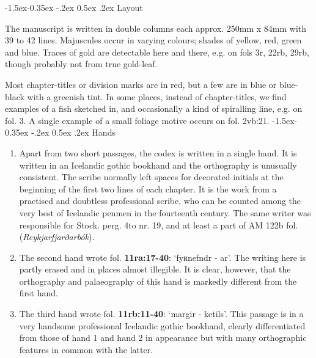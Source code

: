 \documentclass[11pt,twoside]{article}\makeatletter
\makeatletter
\def\ref{}
\renewcommand\subsubsection{\@startsection{subsubsection}{3}{\z@}%
     {-1.5ex\@plus -0.35ex \@minus -.2ex}%
     {0.5ex \@plus .2ex}%
     {\reset@font\large\sffamily}}
\makeatother
\begin{document}
\subsubsection{Layout}
\par
The manuscript is written in double columns each approx. 250mm x 84mm with 39 to 42 lines. Majuscules occur in varying colours; shades of yellow, red, green and blue. Traces of gold are detectable here and there, e.g. on fols 3r, 22rb, 29rb, though probably not from true gold-leaf. \par
Most chapter-titles or division marks are in red, but a few are in blue or blue-black with a greenish tint. In some places, instead of chapter-titles, we find examples of a fish sketched in, and occasionally a kind of spiralling line, e.g. on fol. 3. A single example of a small foliage motive occurs on fol. 2vb:21.
\subsubsection{Hands}
\begin{enumerate}
\item \par
Apart from two short passages, the codex is written in a single hand. It is written in an Icelandic gothic bookhand and the orthography is unusually consistent. The scribe normally left spaces for decorated initials at the beginning of the first two lines of each chapter. It is the work from a practised and doubtless professional scribe, who can be counted among the very best of Icelandic penmen in the fourteenth century. The same writer was responsible for  {\ref Stock. perg. 4to nr. 19}, and at least a part of  {\ref AM 122b fol. (\textit{Reykjarfjarðarbók})}.
\item \par
The second hand wrote fol. \textbf{11ra:17-40}:  ‘fyʀnefndr - ar’. The writing here is partly erased and in places almost illegible. It is clear, however, that the orthography and palaeography of this hand is markedly different from the first hand.
\item \par
The third hand wrote fol. \textbf{11rb:11-40}:  ‘margir - ketils’. This passage is in a very handsome professional Icelandic gothic bookhand, clearly differentiated from those of hand 1 and hand 2 in appearance but with many orthographic features in common with the latter.
\end{enumerate}
\end{document}
